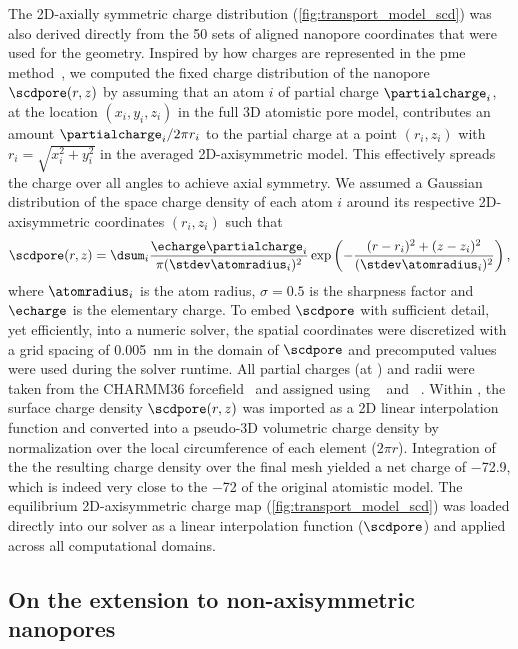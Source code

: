 The 2D-axially symmetric charge distribution (\cref{fig:transport_model_scd}) was also derived directly from
the 50 sets of aligned nanopore coordinates that were used for the geometry. Inspired by how charges are
represented in the \gls{pme} method~\cite{Aksimentiev-2005}, we computed the fixed charge distribution of the
nanopore $\scdpore(r,z)$ by assuming that an atom $i$ of partial charge $\partialcharge_{i}$, at the location
$(x_i, y_i, z_i)$ in the full 3D atomistic pore model, contributes an amount $\partialcharge_{i}/2\pi r_i$ to
the partial charge at a point $(r_i,z_i)$ with $r_i = \sqrt{x_i^2 + y_i^2}$ in the averaged 2D-axisymmetric
model. This effectively spreads the charge over all angles to achieve axial symmetry. We assumed a Gaussian
distribution of the space charge density of each atom $i$ around its respective 2D-axisymmetric coordinates
$(r_i,z_i)$ such that
%
\begin{align}
\label{eq:scdpore}
  \scdpore(r,z) = \dsum_{i} \dfrac{\echarge\partialcharge_{i}}{\pi(\stdev\atomradius_{i})^2}
            \exp{\left(-\dfrac{(r-r_i)^2 + (z-z_i)^2}{(\stdev\atomradius_{i})^2}\right)}
  \text{\,,}
\end{align}
%
where $\atomradius_{i}$ is the atom radius, $\sigma = 0.5$ is the sharpness factor and $\echarge$ is the
elementary charge. To embed $\scdpore$ with sufficient detail, yet efficiently, into a numeric solver, the
spatial coordinates were discretized with a grid spacing of \SI{0.005}{\nm} in the domain of $\scdpore$ and
precomputed values were used during the solver runtime. All partial charges (at ) and radii were taken
from the CHARMM36 forcefield~\cite{Best-2012} and assigned using ~\cite{Olsson-2011} and
~\cite{Jurrus-2018}. Within , the surface charge density $\scdpore(r,z)$ was
imported as a 2D linear interpolation function and converted into a pseudo-3D volumetric charge density by
normalization over the local circumference of each element ($2 \pi r$). Integration of the the resulting
charge density over the final mesh yielded a net charge of \SI{-72.9}{\ec}, which is indeed very close to the
\SI{-72}{\ec} of the original atomistic model. The equilibrium 2D-axisymmetric charge map
(\cref{fig:transport_model_scd}) was loaded directly into our solver as a linear interpolation function
($\scdpore$) and applied across all computational domains.



\subsection{On the extension to non-axisymmetric nanopores}
%

